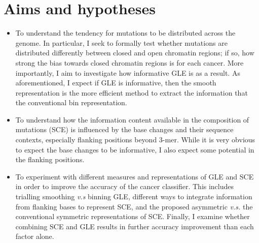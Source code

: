 \section{Aims and hypotheses}
\label{intro:aims}
\begin{itemize}
    \item To understand the tendency for mutations to be distributed across the genome. In particular, I seek to formally test whether mutations are distributed differently between closed and open chromatin regions; if so, how strong the bias towards closed chromatin regions is for each cancer. More importantly, I aim to investigate how informative GLE is as a result. As aforementioned, I expect if GLE is informative, then the smooth representation is the more efficient method to extract the information that the conventional bin representation.
    \item To understand how the information content available in the composition of mutations (SCE) is influenced by the base changes and their sequence contexts, especially flanking positions beyond 3-mer. While it is very obvious to expect the base changes to be informative, I also expect some potential in the flanking positions. 
    \item To experiment with different measures and representations of GLE and SCE in order to improve the accuracy of the cancer classifier. This includes trialling smoothing \textit{v.s} binning GLE, different ways to integrate information from flanking bases to represent SCE, and the proposed asymmetric \textit{v.s.} the conventional symmetric representations of SCE. Finally, I examine whether combining SCE and GLE results in further accuracy improvement than each factor alone.  
\end{itemize}

